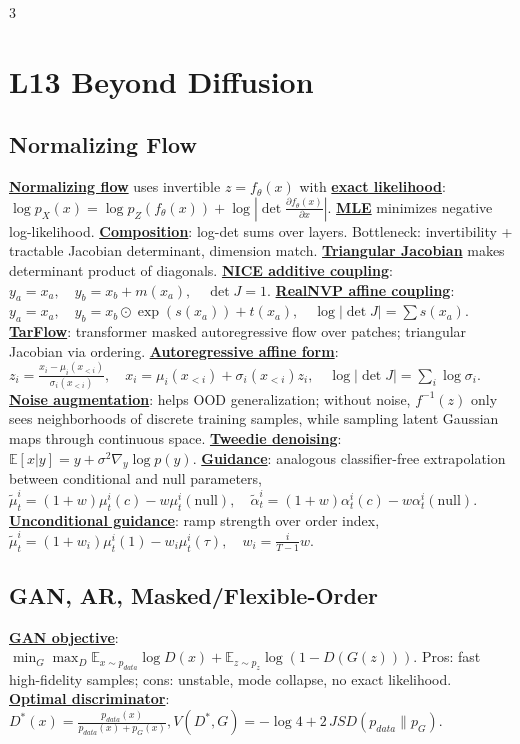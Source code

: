 \documentclass{article}
\numberwithin{equation}{subsection}
\newcommand{\lowterm}[1]{\textbf{\underline{#1}}}
\newcommand{\E}{\mathbb{E}}
\begin{document}
\begin{multicols*}{3}
\section{L13 Beyond Diffusion}
\subsection{Normalizing Flow}
\lowterm{Normalizing flow} uses invertible $z=f_\theta(x)$ with \lowterm{exact likelihood}:
\(
\log p_X(x)=\log p_Z(f_\theta(x))+\log\left|\det\frac{\partial f_\theta(x)}{\partial x}\right|.
\)
\lowterm{MLE} minimizes negative log-likelihood. \lowterm{Composition}: log-det sums over layers. Bottleneck: invertibility + tractable Jacobian determinant, dimension match. \lowterm{Triangular Jacobian} makes determinant product of diagonals. \lowterm{NICE additive coupling}:
\(
y_a=x_a,\quad y_b=x_b+m(x_a),\quad \det J=1.
\)
\lowterm{RealNVP affine coupling}:
\(
y_a=x_a,\quad y_b=x_b\odot\exp(s(x_a))+t(x_a),\quad \log|\det J|=\sum s(x_a).
\)
\lowterm{TarFlow}: transformer masked autoregressive flow over patches; triangular Jacobian via ordering. \lowterm{Autoregressive affine form}:
\(
z_i=\frac{x_i-\mu_i(x_{<i})}{\sigma_i(x_{<i})},\quad
x_i=\mu_i(x_{<i})+\sigma_i(x_{<i})z_i,\quad
\log|\det J|=\sum_i\log\sigma_i .
\)
\lowterm{Noise augmentation}: helps OOD generalization; without noise, $f^{-1}(z)$ only sees neighborhoods of discrete training samples, while sampling latent Gaussian maps through continuous space. \lowterm{Tweedie denoising}:
\(
\E[x|y]=y+\sigma^2\nabla_y\log p(y).
\)
\lowterm{Guidance}: analogous classifier-free extrapolation between conditional and null parameters,
\(
\tilde\mu_t^i=(1+w)\mu_t^i(c)-w\mu_t^i(\mathrm{null}),\quad
\tilde\alpha_t^i=(1+w)\alpha_t^i(c)-w\alpha_t^i(\mathrm{null}).
\)
\lowterm{Unconditional guidance}: ramp strength over order index,
\(
\tilde\mu_t^i=(1+w_i)\mu_t^i(1)-w_i\mu_t^i(\tau),\quad
w_i=\frac{i}{T-1}w.
\)

\subsection{GAN, AR, Masked/Flexible-Order}
\lowterm{GAN objective}:
\(
\min_G\max_D\E_{x\sim p_{data}}\log D(x)+\E_{z\sim p_z}\log(1-D(G(z))).
\)
Pros: fast high-fidelity samples; cons: unstable, mode collapse, no exact likelihood. \lowterm{Optimal discriminator}:
\(
D^*(x)=\frac{p_{data}(x)}{p_{data}(x)+p_G(x)},
V(D^*,G)=-\log4+2\,JSD(p_{data}\|p_G).
\)


\end{multicols*}
\end{document}
